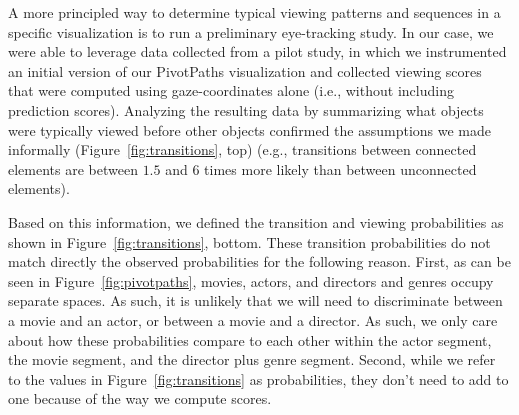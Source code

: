 A more principled way to determine typical viewing patterns and sequences in a specific visualization is to run a preliminary eye-tracking study. In our case, we were able to leverage data collected from a pilot study, in which we instrumented an initial version of our PivotPaths visualization and collected viewing scores that were computed using gaze-coordinates alone (i.e., without including prediction scores). Analyzing the resulting data by summarizing what objects were typically viewed before other objects confirmed the assumptions we made informally (Figure~\ref{fig:transitions}, top) (e.g., transitions between connected elements are between $1.5$ and $6$ times more likely than between unconnected elements). 

Based on this information, we defined the transition and viewing probabilities as shown in Figure~\ref{fig:transitions}, bottom. These transition probabilities do not match directly the observed probabilities for the following reason. First, as can be seen in Figure~\ref{fig:pivotpaths}, movies, actors, and directors and genres occupy separate spaces. As such, it is unlikely that we will need to discriminate between a movie and an actor, or between a movie and a director. As such, we only care about how these probabilities compare to each other within the actor segment, the movie segment, and the director plus genre segment. Second, while we refer to the values in Figure~\ref{fig:transitions} as probabilities, they don't need to add to one because of the way we compute scores. 

